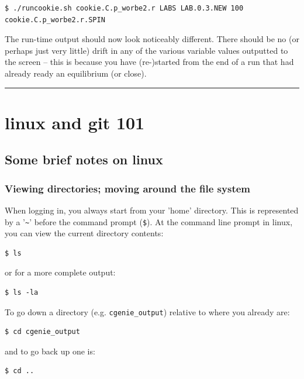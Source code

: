 \vspace{-2mm}
\small\begin{verbatim}
$ ./runcookie.sh cookie.C.p_worbe2.r LABS LAB.0.3.NEW 100 cookie.C.p_worbe2.r.SPIN
\end{verbatim}\normalsize
\vspace{-2mm}

The run-time output should now look noticeably different. There should be no (or perhaps just very little) drift in any of the various variable values outputted to the screen – this is because you have (re-)started from the end of a run that had already ready an equilibrium (or close).

\vspace{1mm}\noindent\rule{4cm}{0.5pt}\vspace{2mm}

\newpage

\section{linux and git 101}


\subsection*{Some brief notes on linux}

%
\subsubsection*{Viewing directories; moving around the file system}

When logging in, you always start from your 'home' directory. This is represented by a '\texttt{\~}'
before the command prompt (\texttt{\$}).
At the command line prompt in linux, you can view the current directory contents:
\small\begin{verbatim}
$ ls
\end{verbatim}\normalsize
or for a more complete output:
\small\begin{verbatim}
$ ls -la
\end{verbatim}\normalsize
To go down a directory (e.g. \texttt{cgenie\_output}) relative to where you already are:
\small\begin{verbatim}
$ cd cgenie_output
\end{verbatim}\normalsize
and to go back up one is:
\small\begin{verbatim}
$ cd ..
\end{verbatim}\normalsize

